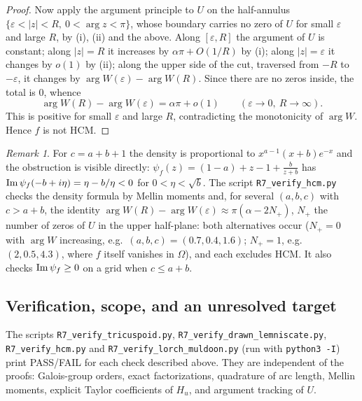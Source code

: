 \documentclass[11pt]{amsart}
\theoremstyle{definition}
\theoremstyle{remark}
\newtheorem{remark}[theorem]{Remark}
\begin{document}
\begin{proof}
Now apply the argument principle to $U$ on the half-annulus
$\{\varepsilon<|z|<R,\ 0<\arg z<\pi\}$, whose boundary carries no zero of $U$
for small $\varepsilon$ and large $R$, by (i), (ii) and the above. Along
$[\varepsilon,R]$ the argument of $U$ is constant; along $|z|=R$ it increases
by $\alpha\pi+O(1/R)$ by (i); along $|z|=\varepsilon$ it changes by $o(1)$ by
(ii); along the upper side of the cut, traversed from $-R$ to $-\varepsilon$,
it changes by $\arg W(\varepsilon)-\arg W(R)$. Since there are no zeros inside,
the total is $0$, whence
\[
 \arg W(R)-\arg W(\varepsilon)=\alpha\pi+o(1)\qquad(\varepsilon\to0,\ R\to\infty).
\]
This is positive for small $\varepsilon$ and large $R$, contradicting the
monotonicity of $\arg W$. Hence $f$ is not HCM.
\end{proof}

\begin{remark}
For $c=a+b+1$ the density is proportional to $x^{a-1}(x+b)e^{-x}$ and the
obstruction is visible directly:
$\psi_f(z)=(1-a)+z-1+\frac{b}{z+b}$ has
$\operatorname{Im}\psi_f(-b+i\eta)=\eta-b/\eta<0$ for $0<\eta<\sqrt b$. The script
\texttt{R7\_\allowbreak{}verify\_\allowbreak{}hcm.py} checks the density formula by Mellin moments and,
for several $(a,b,c)$ with $c>a+b$, the identity
$\arg W(R)-\arg W(\varepsilon)\approx\pi(\alpha-2N_+)$, $N_+$ the number of zeros
of $U$ in the upper half-plane: both alternatives occur ($N_+=0$ with $\arg W$
increasing, e.g.\ $(a,b,c)=(0.7,0.4,1.6)$; $N_+=1$, e.g.\ $(2,0.5,4.3)$, where
$f$ itself vanishes in $\Omega$), and each excludes HCM. It also checks
$\operatorname{Im}\psi_f\ge0$ on a grid when $c\le a+b$.
\end{remark}

\subsection{Verification, scope, and an unresolved target}
\label{R7-ssec-scope}

The scripts \texttt{R7\_\allowbreak{}verify\_\allowbreak{}tricuspoid.py},
\texttt{R7\_\allowbreak{}verify\_\allowbreak{}drawn\_\allowbreak{}lemniscate.py}, \texttt{R7\_\allowbreak{}verify\_\allowbreak{}hcm.py} and
\texttt{R7\_\allowbreak{}verify\_\allowbreak{}lorch\_\allowbreak{}muldoon.py} (run with \texttt{python3 -I}) print
PASS/FAIL for each check described above. They are independent of the proofs:
Galois-group orders, exact factorizations, quadrature of arc length, Mellin
moments, explicit Taylor coefficients of $H_u$, and argument tracking of $U$.
\end{document}
